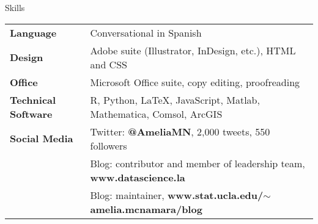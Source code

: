 \documentclass{resume} %
\begin{document}

\begin{rSection}{Skills}

\begin{tabular}{ @{} >{\bfseries}l @{\hspace{6ex}} l }
Language & Conversational in Spanish \\
Design & Adobe suite (Illustrator, InDesign, etc.), %
HTML and CSS \\
Office & Microsoft Office suite, copy editing, proofreading %
 \\
Technical Software & R, Python, LaTeX, JavaScript, Matlab, Mathematica, Comsol, ArcGIS \\
Social Media & Twitter: \textbf{@AmeliaMN}, 2,000 tweets, 550 followers \\
 & Blog: contributor and member of leadership team, \textbf{www.datascience.la} \\
 & Blog: maintainer, \textbf{www.stat.ucla.edu/$\sim$amelia.mcnamara/blog}
\end{tabular}
\end{rSection}
\end{document}
